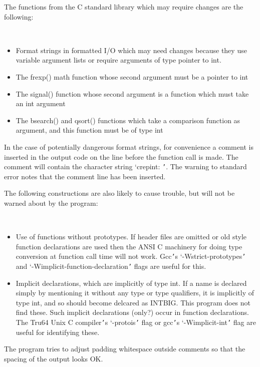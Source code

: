 \documentclass[twoside,11pt]{article}
\renewcommand{\_}{\texttt{\symbol{95}}}
\newcommand{\sstitemlist}[1]{
  \mbox{} \\
  \vspace{-3.5ex}
  \begin{itemize}
     #1
  \end{itemize}
}
\newcommand{\sstitem}{\item}
\newcommand{\sstitemlist}[1]{
      \begin{itemize}
         #1
      \end{itemize}
      \\
   }
\newcommand{\sstitem}{\item}
\begin{document}
{{{      }
      The functions from the C standard library which may require changes
      are the following:
      \sstitemlist{

         \sstitem
            Format strings in formatted I/O which may need changes
              because they use variable argument lists or require
              arguments of type pointer to int.

         \sstitem
            The frexp() math function whose second argument must be
              a pointer to int

         \sstitem
            The signal() function whose second argument is a function
              which must take an int argument

         \sstitem
            The bsearch() and qsort() functions which take a comparison
              function as argument, and this function must be of type int

      }
      In the case of potentially dangerous format strings, for
      convenience a comment is inserted in the output code on the line
      before the function call is made.  The comment will contain the
      character string `crepint: {\tt '}.  The warning to standard error
      notes that the comment line has been inserted.

      The following constructions are also likely to cause trouble, but
      will not be warned about by the program:
      \sstitemlist{

         \sstitem
            Use of functions without prototypes.  If header files are
              omitted or old style function declarations are used then the
              ANSI C machinery for doing type conversion at function call
              time will not work.  Gcc{\tt '}s `-Wstrict-prototypes{\tt '} and
              `-Wimplicit-function-declaration{\tt '} flags are useful for this.

         \sstitem
            Implicit declarations, which are implicitly of type int.
              If a name is declared simply by mentioning it without any type
              or type qualifiers, it is implicitly of type int, and so
              should become delcared as INT\_BIG.  This program does not
              find these.  Such implicit declarations (only?) occur in
              function declarations.  The Tru64 Unix C compiler{\tt '}s `-protois{\tt '}
              flag or gcc{\tt '}s `-Wimplicit-int{\tt '} flag are useful for identifying
              these.

      }
      The program tries to adjust padding whitespace outside comments
      so that the spacing of the output looks OK.

}}
\end{document}

